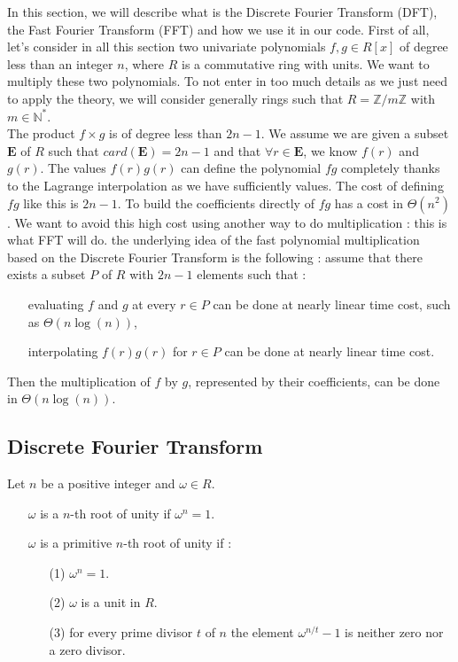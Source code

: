 In this section, we will describe what is the Discrete Fourier Transform (DFT), the Fast Fourier Transform (FFT) and how we use it in our code. First of all, let's consider in all this section two univariate polynomials $f,g \in R[x]$ of degree less than an integer $n$, where $R$ is a commutative ring with units. We want to multiply these two polynomials. To not enter in too much details as we just need to apply the theory, we will consider generally rings such that $R=\mathbb{Z}/m\mathbb{Z}$ with $m\in\mathbb{N}^*$. \\

The product $f\times g$ is of degree less than $2n-1$. We assume we are given a subset $\mathbf{E}$ of $R$ such that $card(\mathbf{E}) = 2n-1$ and that $\forall r \in \mathbf{E}$, we know $f(r)$ and $g(r)$. The values $f(r)g(r)$ can define the polynomial $fg$ completely thanks to the Lagrange interpolation as we have sufficiently values. The cost of defining $fg$ like this is $2n-1$.
To build the coefficients directly of $fg$ has a cost in $\Theta(n^2)$. We want to avoid this high cost using another way to do multiplication : this is what FFT will do. the underlying idea of the fast polynomial multiplication based on the Discrete Fourier Transform is the following : assume that there exists a subset $P$ of $R$ with $2n-1$ elements such that : \\

\begin{itemize}
\item[\textbullet] evaluating $f$ and $g$ at every $r\in P$ can be done at nearly linear time cost, such as $\Theta(n\log(n))$,
\item[\textbullet] interpolating $f(r)g(r)$ for $r\in P$ can be done at nearly linear time cost.
\end{itemize}

Then the multiplication of $f$ by $g$, represented by their coefficients, can be done in $\Theta(n\log(n))$.

\subsection{Discrete Fourier Transform}

\begin{definition*}
Let $n$ be a positive integer and $\omega \in R$. \\
\begin{itemize}
\item[\textbullet] $\omega$ is a $n$-th root of unity if $\omega^{n} = 1$.
\item[\textbullet] $\omega$ is a primitive $n$-th root of unity if :
\begin{itemize}
\item[(1)] $\omega^{n} = 1$.
\item[(2)] $\omega$ is a unit in $R$.
\item[(3)] for every prime divisor $t$ of $n$ the element $\omega^{n/t} - 1$ is neither zero nor a zero divisor.
\end{itemize}
\end{itemize}
\end{definition*}


